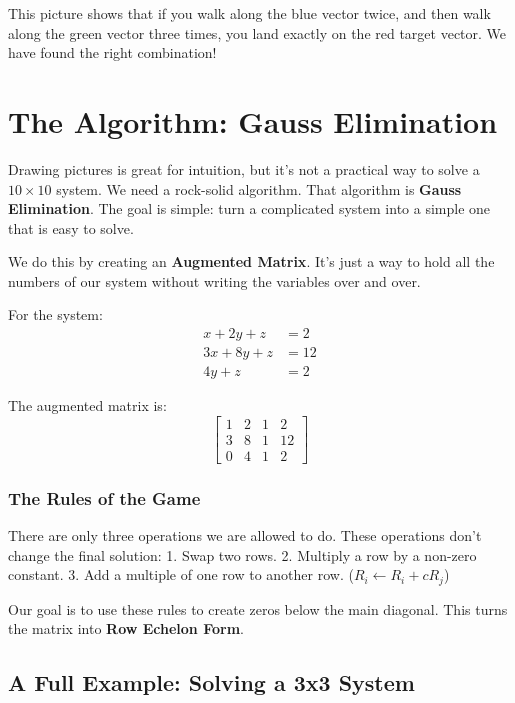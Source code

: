 \documentclass[
  letterpaper,
  DIV=11,
  numbers=noendperiod]{scrreprt}
\begin{document}
This picture shows that if you walk along the blue vector twice, and
then walk along the green vector three times, you land exactly on the
red target vector. We have found the right combination!

\section{The Algorithm: Gauss
Elimination}\label{the-algorithm-gauss-elimination}

Drawing pictures is great for intuition, but it's not a practical way to
solve a \(10 \times 10\) system. We need a rock-solid algorithm. That
algorithm is \textbf{Gauss Elimination}. The goal is simple: turn a
complicated system into a simple one that is easy to solve.

We do this by creating an \textbf{Augmented Matrix}. It's just a way to
hold all the numbers of our system without writing the variables over
and over.

For the system: \[
\begin{align*}
x + 2y + z &= 2 \\
3x + 8y + z &= 12 \\
4y + z &= 2
\end{align*}
\]

The augmented matrix is: \[
\left[
\begin{array}{ccc|c}
1 & 2 & 1 & 2 \\
3 & 8 & 1 & 12 \\
0 & 4 & 1 & 2
\end{array}
\right]
\]

\subsubsection{The Rules of the Game}\label{the-rules-of-the-game}

There are only three operations we are allowed to do. These operations
don't change the final solution: 1. Swap two rows. 2. Multiply a row by
a non-zero constant. 3. Add a multiple of one row to another row.
(\(R_i \leftarrow R_i + cR_j\))

Our goal is to use these rules to create zeros below the main diagonal.
This turns the matrix into \textbf{Row Echelon Form}.

\subsection{A Full Example: Solving a 3x3
System}\label{a-full-example-solving-a-3x3-system}
\end{document}
